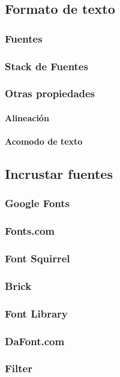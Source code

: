 \documentclass[12pt]{report}
\begin{document}
		\subsection{Formato de texto}
			\subsubsection{Fuentes}
			\subsubsection{Stack de Fuentes}
			\subsubsection{Otras propiedades}
				\paragraph{Alineación}
				\paragraph{Acomodo de texto}
		\subsection{Incrustar fuentes}
			\subsubsection{Google Fonts}
			\subsubsection{Fonts.com}
			\subsubsection{Font Squirrel}
			\subsubsection{Brick}
			\subsubsection{Font Library}
			\subsubsection{DaFont.com}
			\subsubsection{Filter}
\end{document}
